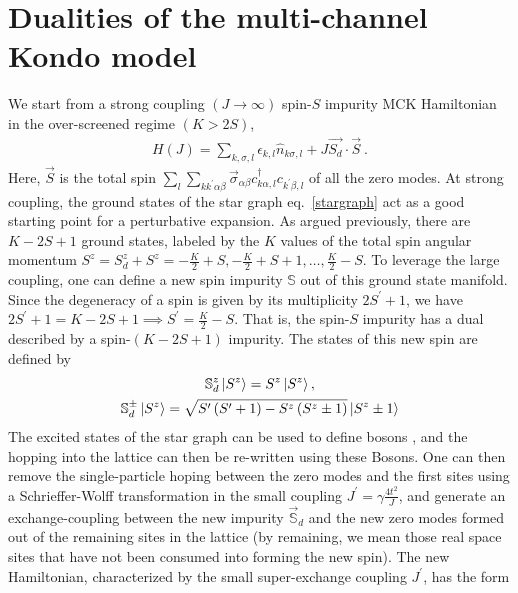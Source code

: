 \documentclass[reprint,prb,superscriptaddress]{revtex4-2}
\begin{document}
\section{Dualities of the multi-channel Kondo model}
We start from a strong coupling \((J \to \infty)\) spin-\(S\) impurity MCK Hamiltonian in the over-screened regime \(\left( K > 2S \right) \),
\begin{equation}\begin{aligned}
	\label{strong_ham}
	H(J) = \sum_{k,\sigma,l}\epsilon_{k,l} \hat n_{k\sigma,l} + J \vec{S_d}\cdot\vec{S}~.
\end{aligned}\end{equation}
Here, \(\vec S\) is the total spin \(\sum_l \sum_{kk^\prime \alpha\beta} \vec \sigma_{\alpha\beta}c^\dagger_{k\alpha,l}c_{k^\prime\beta,l}\) of all the zero modes. At strong coupling, the ground states of the star graph eq.~\ref{stargraph} act as a good starting point for a perturbative expansion. As argued previously, there are \(K-2S+1\) ground states, labeled by the \(K\) values of the total spin angular momentum \(S^z = S_d^z + S^z = -\frac{K}{2} + S, -\frac{K}{2} + S + 1, \ldots, \frac{K}{2} - S\). To leverage the large coupling, one can define a new spin impurity \(\mathbb{S}\) out of this ground state manifold. Since the degeneracy of a spin is given by its multiplicity \(2S^\prime + 1\), we have \(2S^\prime + 1 = K-2S+1 \implies S^\prime = \frac{K}{2} - S\). That is, the spin-\(S\) impurity has a dual described by a spin-\((K-2S+1)\) impurity. The states of this new spin are defined by
\begin{gather}
	\mathbb{S}_d^z \ket{S^z} = S^z \ket{S^z},\nonumber\\
	\mathbb{S}_d^\pm \ket{S^z} = \sqrt{S^\prime\left( S^\prime + 1 \right) - S^z\left( S^z \pm 1\right)} \ket{S^z \pm 1}
\end{gather}
The excited states of the star graph can be used to define bosons \cite{kroha_kolf_2007}, and the hopping into the lattice can then be re-written using these Bosons. One can then remove the single-particle hoping between the zero modes and the first sites using a Schrieffer-Wolff transformation in the small coupling \(J^\prime = \gamma \frac{4t^2}{J}\), and generate an exchange-coupling between the new impurity \(\vec {\mathbb{S}}_d\) and the new zero modes formed out of the remaining sites in the lattice \cite{kroha_kolf_2007} (by remaining, we mean those real space sites that have not been consumed into forming the new spin). The new Hamiltonian, characterized by the small super-exchange  coupling \(J^\prime\), has the form
\end{document}
